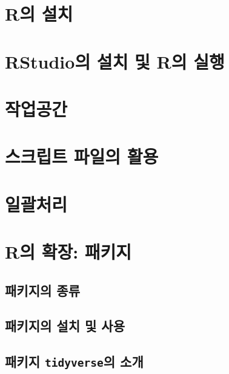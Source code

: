 \documentclass[
]{book}
\begin{document}
\hypertarget{ruxc758-uxc124uxce58}{%
\section{R의 설치}\label{ruxc758-uxc124uxce58}}

\hypertarget{rstudiouxc758-uxc124uxce58-uxbc0f-ruxc758-uxc2e4uxd589}{%
\section{RStudio의 설치 및 R의 실행}\label{rstudiouxc758-uxc124uxce58-uxbc0f-ruxc758-uxc2e4uxd589}}

\hypertarget{uxc791uxc5c5uxacf5uxac04}{%
\section{작업공간}\label{uxc791uxc5c5uxacf5uxac04}}

\hypertarget{uxc2a4uxd06cuxb9bduxd2b8-uxd30cuxc77cuxc758-uxd65cuxc6a9}{%
\section{스크립트 파일의 활용}\label{uxc2a4uxd06cuxb9bduxd2b8-uxd30cuxc77cuxc758-uxd65cuxc6a9}}

\hypertarget{section-batch}{%
\section{일괄처리}\label{section-batch}}

\hypertarget{section-package}{%
\section{R의 확장: 패키지}\label{section-package}}

\hypertarget{uxd328uxd0a4uxc9c0uxc758-uxc885uxb958}{%
\subsection{패키지의 종류}\label{uxd328uxd0a4uxc9c0uxc758-uxc885uxb958}}

\hypertarget{uxd328uxd0a4uxc9c0uxc758-uxc124uxce58-uxbc0f-uxc0acuxc6a9}{%
\subsection{패키지의 설치 및 사용}\label{uxd328uxd0a4uxc9c0uxc758-uxc124uxce58-uxbc0f-uxc0acuxc6a9}}

\hypertarget{uxd328uxd0a4uxc9c0-tidyverseuxc758-uxc18cuxac1c}{%
\subsection{\texorpdfstring{패키지 \texttt{tidyverse}의 소개}{패키지 tidyverse의 소개}}\label{uxd328uxd0a4uxc9c0-tidyverseuxc758-uxc18cuxac1c}}
\end{document}
